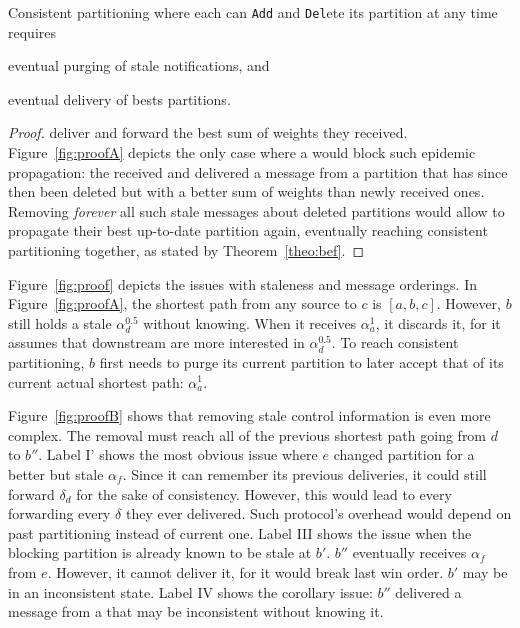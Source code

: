 
\begin{corollary}
  Consistent partitioning where each \process can \texttt{Add} and
  \texttt{Del}ete its partition at any time requires
  \begin{inparaenum}[(i)]
  \item eventual purging of stale notifications, and
  \item eventual delivery of bests partitions.
  \end{inparaenum}
\end{corollary}

\begin{proof}
  \Processes deliver and forward the best sum of weights they
  received. Figure~\ref{fig:proofA} depicts the only case where a
  \process would block such epidemic propagation: the \process
  received and delivered a message from a partition that has since
  then been deleted but with a better sum of weights than newly
  received ones. Removing \emph{forever} all such stale messages about
  deleted partitions would allow \processes to propagate their best
  up-to-date partition again, eventually reaching consistent
  partitioning together, as stated by Theorem~\ref{theo:bef}.
\end{proof}



Figure~\ref{fig:proof} depicts the issues with staleness and message
orderings. In Figure~\ref{fig:proofA}, the shortest path from any
source to \Process $c$ is $[a, b, c]$. However, \Process $b$ still holds
a stale $\alpha_d^{0.5}$ without knowing. When it receives
$\alpha_a^1$, it discards it, for it assumes that downstream \processes
are more interested in $\alpha_d^{0.5}$. To reach consistent
partitioning, \Process $b$ first needs to purge its current partition
to later accept that of its current actual shortest path:
$\alpha_a^1$.

\noindent Figure~\ref{fig:proofB} shows that removing stale control
information is even more complex. The removal must reach all \processes
of the previous shortest path going from $d$ to $b''$. Label I' shows
the most obvious issue where \Process $e$ changed partition for a
better but stale $\alpha_f$. Since it can remember its previous
deliveries, it could still forward $\delta_d$ for the sake of
consistency. However, this would lead to every \process forwarding
every $\delta$ they ever delivered. Such protocol's overhead would
depend on past partitioning instead of current one. Label III shows
the issue when the blocking partition is already known to be stale at
\Process $b'$. \Process $b''$ eventually receives $\alpha_f$ from
$e$. However, it cannot deliver it, for it would break last win order.
\Process $b'$ may be in an inconsistent state. Label IV shows the
corollary issue: \Process $b''$ delivered a message from a \process that
may be inconsistent without knowing it.


